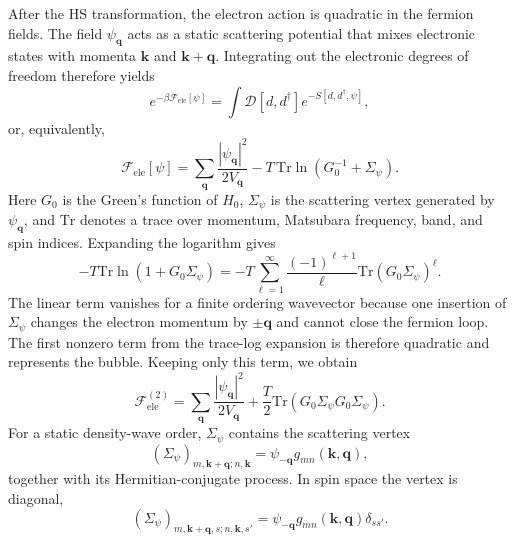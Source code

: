 \documentclass[aps,prl,article,twocolumn,preprintnumbers,amsmath,amssymb,superscriptaddress]{revtex4-2}
\begin{document}
After the HS transformation, the electron action is quadratic in the
fermion fields.  The field $\psi_{\mathbf q}$ acts as a static scattering
potential that mixes electronic states with momenta $\mathbf k$ and
$\mathbf k+\mathbf q$.  Integrating out the electronic degrees of freedom
therefore yields
\begin{equation}
e^{-\beta \mathcal{F}_{\mathrm{ele}}[\psi]}
=
\int
\mathcal D[d,d^\dagger]
e^{-S[d,d^\dagger,\psi]} ,
\end{equation}
or, equivalently,
\begin{equation}
\mathcal F_{\mathrm{ele}}[\psi]
=
\sum_{\mathbf q}
\frac{|\psi_{\mathbf q}|^2}{2V_{\mathbf q}}
-
T\,\mathrm{Tr}
\ln
\left(
G_0^{-1}
+
\Sigma_\psi
\right).
\end{equation}
Here $G_0$ is the Green's function of $H_0$, $\Sigma_\psi$ is the
scattering vertex generated by $\psi_{\mathbf q}$, and $\mathrm{Tr}$
denotes a trace over momentum, Matsubara frequency, band, and spin indices.
Expanding the logarithm gives
\begin{equation}\label{siLogExpansion}
-
T\mathrm{Tr}
\ln
\left(
1
+
G_0\Sigma_\psi
\right)
=
-
T
\sum_{\ell=1}^{\infty}
\frac{(-1)^{\ell+1}}{\ell}
\mathrm{Tr}
\left(
G_0\Sigma_\psi
\right)^\ell .
\end{equation}
The linear term vanishes for a finite ordering wavevector because one
insertion of $\Sigma_\psi$ changes the electron momentum by
$\pm\mathbf q$ and cannot close the fermion loop.  The first nonzero term
from the trace-log expansion is therefore quadratic and represents the
bubble.  Keeping only this term, we obtain
\begin{equation}
\label{eq:siQuadraticTrace}
\mathcal F_{\mathrm{ele}}^{(2)}
=
\sum_{\mathbf q}
\frac{|\psi_{\mathbf q}|^2}{2V_{\mathbf q}}
+
\frac{T}{2}
\mathrm{Tr}
\left(
G_0\Sigma_\psi
G_0\Sigma_\psi
\right).
\end{equation}
For a static density-wave order, $\Sigma_\psi$ contains the scattering
vertex
\begin{equation}
\left(\Sigma_\psi\right)_{m,\mathbf k+\mathbf q;n,\mathbf k}
=
\psi_{-\mathbf q}
g_{mn}(\mathbf k,\mathbf q),
\end{equation}
together with its Hermitian-conjugate process.  In spin space the vertex
is diagonal,
\begin{equation}
\left(\Sigma_\psi\right)_{m,\mathbf k+\mathbf q,s;n,\mathbf k,s'}
=
\psi_{-\mathbf q}
g_{mn}(\mathbf k,\mathbf q)
\delta_{ss'} .
\end{equation}
\end{document}
